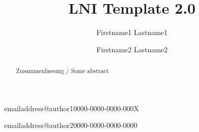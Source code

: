 \documentclass{lni}
\begin{document}
\title{LNI Template 2.0}
\author[1]{Firstname1 Lastname1}{emailaddress@author1}{0000-0000-0000-000X}
\author[1,2]{Firstname2 Lastname2}{emailaddress@author2}{0000-0000-0000-0000}

\maketitle

\begin{abstract}
Zusammenfassung / Some abstract
\end{abstract}


\blinddocument
\end{document}
